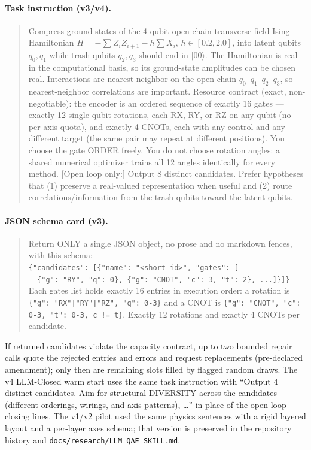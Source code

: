 \documentclass[11pt]{article}
\begin{document}
\paragraph{Task instruction (v3/v4).}
\begin{quote}
Compress ground states of the 4-qubit open-chain transverse-field Ising Hamiltonian
$H=-\sum Z_iZ_{i+1}-h\sum X_i$, $h\in[0.2,2.0]$, into latent qubits $q_0,q_1$ while trash qubits $q_2,q_3$ should end in $\lvert00\rangle$.
The Hamiltonian is real in the computational basis, so its ground-state amplitudes can be chosen real.
Interactions are nearest-neighbor on the open chain $q_0$--$q_1$--$q_2$--$q_3$, so nearest-neighbor correlations are important.
Resource contract (exact, non-negotiable): the encoder is an ordered sequence of exactly 16 gates --- exactly 12 single-qubit rotations, each RX, RY, or RZ on any qubit (no per-axis quota), and exactly 4 CNOTs, each with any control and any different target (the same pair may repeat at different positions).
You choose the gate ORDER freely.
You do not choose rotation angles: a shared numerical optimizer trains all 12 angles identically for every method.
[Open loop only:] Output 8 distinct candidates.
Prefer hypotheses that (1) preserve a real-valued representation when useful and (2) route correlations/information from the trash qubits toward the latent qubits.
\end{quote}

\paragraph{JSON schema card (v3).}
\begin{quote}\small
Return ONLY a single JSON object, no prose and no markdown fences, with this schema:\\
\texttt{\{"candidates": [\{"name": "<short-id>", "gates": [}\\
\texttt{\ \ \{"g": "RY", "q": 0\}, \{"g": "CNOT", "c": 3, "t": 2\}, ...]\}]\}}\\
Each gates list holds exactly 16 entries in execution order: a rotation is \texttt{\{"g": "RX"|"RY"|"RZ", "q": 0-3\}} and a CNOT is \texttt{\{"g": "CNOT", "c": 0-3, "t": 0-3, c != t\}}. Exactly 12 rotations and exactly 4 CNOTs per candidate.
\end{quote}
If returned candidates violate the capacity contract, up to two bounded repair calls quote the rejected entries and errors and request replacements (pre-declared amendment); only then are remaining slots filled by flagged random draws.
The v4 LLM-Closed warm start uses the same task instruction with ``Output 4 distinct candidates. Aim for structural DIVERSITY across the candidates (different orderings, wirings, and axis patterns), \ldots'' in place of the open-loop closing lines.
The v1/v2 pilot used the same physics sentences with a rigid layered layout and a per-layer axes schema; that version is preserved in the repository history and \texttt{docs/research/LLM\_QAE\_SKILL.md}.
\end{document}
